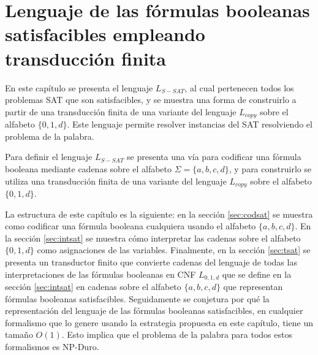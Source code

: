 

\chapter{Lenguaje de las fórmulas booleanas satisfacibles empleando transducción finita}
\label{chap:LSATFT}


En este capítulo se presenta el lenguaje $L_{S-SAT}$, al cual pertenecen todos los problemas SAT que son 
satisfacibles, y se muestra una forma de construirlo a partir de una transducción finita de una variante 
del lenguaje $L_{copy}$ sobre el alfabeto $\{0,1,d\}$. Este lenguaje permite resolver instancias del SAT resolviendo el problema de la palabra.  

Para definir el lenguaje $L_{S-SAT}$ se presenta una vía para codificar una fórmula booleana mediante 
cadenas sobre el alfabeto $\Sigma=\{a, b,c,d\}$, y para construirlo se utiliza una transducción finita 
de una variante del lenguaje $L_{copy}$ sobre el alfabeto $\{0,1,d\}$.

La estructura de este capítulo es la siguiente: en la sección \ref{sec:codsat} se muestra como codificar una 
fórmula booleana cualquiera usando el alfabeto $\{a,b,c,d\}$. En la sección \ref{sec:intsat} se muestra 
cómo interpretar las cadenas sobre el alfabeto $\{0,1,d\}$ como asignaciones de las variables. Finalmente, 
en la sección \ref{sec:tsat} se presenta un transductor finito que convierte cadenas del lenguaje de todas las
interpretaciones de las fórmulas booleanas en CNF
$L_{0,1,d}$ que se define en la sección \ref{sec:intsat} en cadenas sobre el alfabeto $\{a,b,c,d\}$ que 
representan fórmulas booleanas satisfacibles. Seguidamente se conjetura por qué la representación del 
lenguaje de las fórmulas booleanas satisfacibles, en cualquier formalismo que lo genere usando la estrategia 
propuesta en este capítulo, tiene un tamaño $O(1)$. Esto implica que el problema de la palabra para todos estos 
formalismos es NP-Duro.


